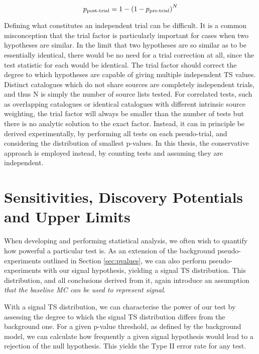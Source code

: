 \begin{equation}
p_{\textup{post-trial}} = 1 - \left( 1 - p_{\textup{pre-trial}} \right)^{N}
\label{eq:trial_correction}
\end{equation}

Defining what constitutes an independent trial can be difficult. It is a common misconception that the trial factor is particularly important for cases when two hypotheses are similar. In the limit that two hypotheses are so similar as to be essentially identical, there would be no need for a trial correction at all, since the test statistic for each would be identical. The trial factor should correct the degree to which hypotheses are capable of giving multiple independent TS values. Distinct catalogues which do not share sources are completely independent trials, and thus N is simply the number of source lists tested. For correlated tests, such as overlapping catalogues or identical catalogues with different intrinsic source weighting, the trial factor will always be smaller than the number of tests but there is no analytic solution to the exact factor. Instead, it can in principle be derived experimentally, by performing all tests on each pseudo-trial, and considering the distribution of smallest p-values. In this thesis, the conservative approach is employed instead, by counting tests and assuming they are independent.

\section{Sensitivities, Discovery Potentials and Upper Limits}
\label{sec:sens_uls}

When developing and performing statistical analysis, we often wish to quantify how powerful a particular test is. As an extension of the background pseudo-experiments outlined in Section \ref{sec:pvalues}, we can also perform pseudo-experiments with our signal hypothesis, yielding a signal TS distribution. This distribution, and all conclusions derived from it, again introduce an assumption \emph{that the baseline MC can be used to represent signal}. 

With a signal TS distribution, we can characterise the power of our test by assessing the degree to which the signal TS distribution differs from the background one. For a given p-value threshold, as defined by the background model, we can calculate how frequently a given signal hypothesis would lead to a rejection of the null hypothesis. This yields the Type II error rate for any test.

